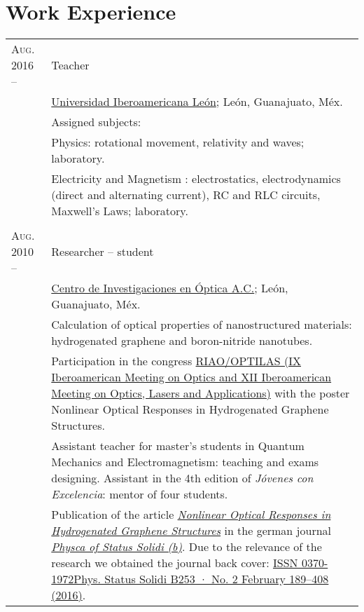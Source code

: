 \documentclass[letterpaper,10pt]{article}
\begin{document}
\section{Work Experience}
\begin{tabular}{R{4cm}|p{11cm}}
\textsc{Aug. 2016 --  } &   Teacher \\
                        &   \href{http://www.leon.uia.mx}{Universidad Iberoamericana Le\'on}; Le\'on, Guanajuato, M\'ex.\\
                        &   \footnotesize{Assigned subjects: }\\
                        &\footnotesize{\qquad Physics: rotational movement,  relativity and waves; laboratory. }\\
                        &\footnotesize{\qquad Electricity and Magnetism : electrostatics, electrodynamics (direct and alternating current), RC and RLC circuits, Maxwell's Laws; laboratory. }\\
                         \\
\textsc{Aug. 2010 --}   &   Researcher -- student\\
                        &   \href{http://www.cio.mx/}{Centro de Investigaciones en \'Optica A.C.}; Le\'on, Guanajuato, M\'ex.\\
                        &   \footnotesize{Calculation of optical properties of nanostructured materials: hydrogenated graphene and boron-nitride nanotubes.}\\
                        &   \footnotesize{Participation in the congress \href{http://riaooptilas.cefop.cl/en/}{RIAO/OPTILAS (IX Iberoamerican Meeting on Optics and XII Iberoamerican Meeting on Optics, Lasers and Applications)} with the poster Nonlinear Optical Responses in Hydrogenated Graphene Structures.}\\
                        &   \footnotesize{Assistant teacher for master's students in Quantum Mechanics and Electromagnetism: teaching and exams designing. Assistant in the 4th edition of \emph{J\'ovenes con Excelencia}: mentor of four students.}\\
                        &   \footnotesize{Publication of the article \emph{\href{http://onlinelibrary.wiley.com/doi/10.1002/pssb.201670511/abstract}{Nonlinear Optical Responses in Hydrogenated Graphene Structures}} in the german journal \href{http://onlinelibrary.wiley.com/journal/10.1002/(ISSN)1521-3951}{\emph{Physca of Status Solidi (b)}}. Due to the relevance of the research we obtained the journal back cover: \href{http://onlinelibrary.wiley.com/doi/10.1002/pssb.201670511/epdf}{ISSN 0370-1972Phys. Status Solidi B253 · No. 2 February 189–408 (2016)}.} \\

\end{tabular}
\end{document}
